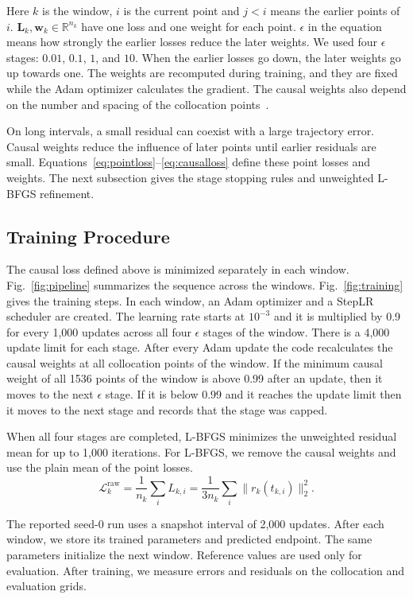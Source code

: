 \documentclass[conference,a4paper]{IEEEtran}
\begin{document}
Here $k$ is the window, $i$ is the current point and $j<i$ means the earlier points of $i$. $\mathbf{L}_k,\mathbf{w}_k\in\mathbb{R}^{n_k}$ have one loss and one weight for each point. $\epsilon$ in the equation means how strongly the earlier losses reduce the later weights. We used four $\epsilon$ stages: $0.01$, $0.1$, $1$, and $10$. When the earlier losses go down, the later weights go up towards one. The weights are recomputed during training, and they are fixed while the Adam optimizer calculates the gradient. The causal weights also depend on the number and spacing of the collocation points~\cite{wang2024causal}.

On long intervals, a small residual can coexist with a large trajectory error. Causal weights reduce the influence of later points until earlier residuals are small. Equations~\eqref{eq:pointloss}--\eqref{eq:causalloss} define these point losses and weights. The next subsection gives the stage stopping rules and unweighted L-BFGS refinement.

\subsection{Training Procedure}

The causal loss defined above is minimized separately in each window. Fig.~\ref{fig:pipeline} summarizes the sequence across the windows. Fig.~\ref{fig:training} gives the training steps. In each window, an Adam optimizer and a StepLR scheduler are created. The learning rate starts at $10^{-3}$ and it is multiplied by 0.9 for every 1,000 updates across all four $\epsilon$ stages of the window. There is a 4,000 update limit for each stage. After every Adam update the code recalculates the causal weights at all collocation points of the window. If the minimum causal weight of all 1536 points of the window is above 0.99 after an update, then it moves to the next $\epsilon$ stage. If it is below 0.99 and it reaches the update limit then it moves to the next stage and records that the stage was capped.

When all four stages are completed, L-BFGS minimizes the unweighted residual mean for up to 1,000 iterations. For L-BFGS, we remove the causal weights and use the plain mean of the point losses.
\[
\mathcal{L}^{\mathrm{raw}}_k
=\frac{1}{n_k}\sum_i L_{k,i}
=\frac{1}{3n_k}\sum_i\|r_k(t_{k,i})\|_2^2.
\]

The reported seed-0 run uses a snapshot interval of 2,000 updates. After each window, we store its trained parameters and predicted endpoint. The same parameters initialize the next window. Reference values are used only for evaluation. After training, we measure errors and residuals on the collocation and evaluation grids.
\end{document}
